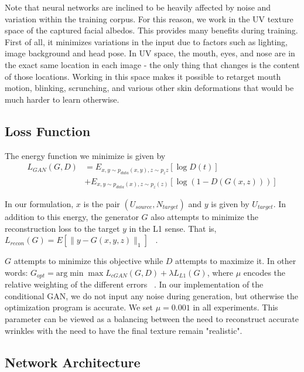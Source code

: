 Note that neural networks are inclined to be heavily affected by noise and variation within the training corpus.  For this reason, we work in the UV texture space of the captured facial albedos.  This provides many benefits during training.  First of all, it minimizes variations in the input due to factors such as lighting, image background and head pose. In UV space, the mouth, eyes, and nose are in the exact same location in each image - the only thing that changes is the content of those locations. Working in this space makes it possible to retarget mouth motion, blinking, scrunching, and various other skin deformations that would be much harder to learn otherwise.  


\subsection{Loss Function}

The energy function we minimize is given by 
\begin{equation} \label{eqn:1}
\begin{split}
L_{GAN}(G,D)& = E_{{x,y}\sim p_{data}({x,y}),z\sim p_z{z}}[\log D({t})]\\
& +E_{{x,y}\sim p_{data}(x),z\sim p_z(z)}[\log(1-D(G(x,z)))] 
\end{split}
\end{equation}

In our formulation, $x$ is the pair $(U_{source}, N_{target})$ and $y$ is given by $U_{target}$.  
In addition to this energy, the generator $G$ also attempts to minimize the reconstruction loss to the target $y$ in the L1 sense.  
That is, $L_{recon}(G)= E[\parallel y-G({x,y},z)\parallel_1]$ ~\cite{pix2pix}.

$G$ attempts to minimize this objective while $D$ attempts to maximize it.  In other words:
$ G_{opt}=\text{arg}\min\max L_{cGAN}(G,D)+\lambda L_{L1}(G)$, where $\mu$ 
encodes the relative weighting of the different errors ~\cite{pix2pix}.  In our implementation of the conditional GAN, 
we do not input any noise during generation, but otherwise the optimization program is accurate.  We set $\mu = 0.001$ in all experiments. 
This parameter can be viewed as a balancing between the need to reconstruct accurate wrinkles with the need to have the final texture
remain "realistic".  

\subsection{Network Architecture}



